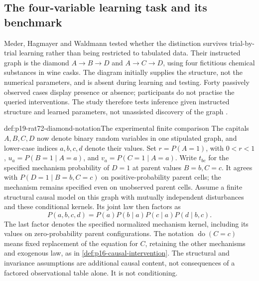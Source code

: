 \subsection{The four-variable learning task and its benchmark}

Meder, Hagmayer and Waldmann tested whether the distinction survives
trial-by-trial learning rather than being restricted to tabulated data.
Their instructed graph is the diamond
\(A\to B\to D\) and \(A\to C\to D\), using four fictitious chemical
substances in wine casks. The diagram initially supplies the structure,
not the numerical parameters, and is absent during learning and testing.
Forty passively observed cases display presence or absence; participants
do not practise the queried interventions. The study therefore tests
inference given instructed structure and learned parameters, not
unassisted discovery of the graph
\cite[pp.~75--77]{MederHagmayerWaldmann2008Interventional}.

\begin{hbconvention}{def:p19-rat72-diamond-notation}{The experimental finite comparison}
The capitals \(A,B,C,D\) now denote binary random variables in one
stipulated graph, and lower-case indices \(a,b,c,d\) denote their
values. Set \(r=P(A=1)\), with \(0<r<1\),
\(u_a=P(B=1\mid A=a)\), and \(v_a=P(C=1\mid A=a)\).
Write \(t_{bc}\) for the specified mechanism probability of \(D=1\)
at parent values \(B=b,C=c\). It agrees with
\(P(D=1\mid B=b,C=c)\) on positive-probability parent cells;
the mechanism remains specified even on unobserved parent cells.
Assume a finite structural causal model on this graph with mutually
independent disturbances and these conditional kernels. Its joint law
then factors as
\[
 P(a,b,c,d)=P(a)P(b\mid a)P(c\mid a)P(d\mid b,c).
\]
The last factor denotes the specified normalized mechanism kernel,
including its values on zero-probability parent configurations.
The notation \(\operatorname{do}(C=c)\) means fixed replacement of
the equation for \(C\), retaining the other mechanisms and exogenous
law, as in \cref{def:p16-causal-intervention}. The structural and
invariance assumptions are additional causal content, not consequences
of a factored observational table alone. It is not conditioning.
\end{hbconvention}

